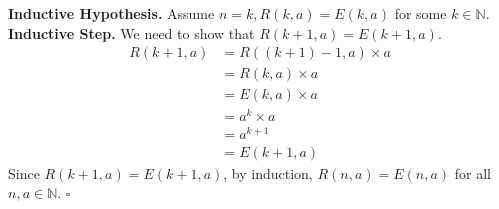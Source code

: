 \documentclass[11pt]{article}
\begin{document}
\textbf{Inductive Hypothesis. } Assume $n=k, R(k, a) = E(k, a)$ for some $k \in \mathbb{N}$. \\
\textbf{Inductive Step. } We need to show that $R(k+1, a) = E(k+1, a)$. 
\begin{align*}
    R(k+1, a) &= R((k+1)-1, a) \times a \\
    &= R(k, a) \times a \\
    &= E(k, a) \times a \\
    &= a^k \times a \\
    &= a^{k+1} \\
    &= E(k+1, a)
\end{align*}
Since $R(k+1, a) = E(k+1, a)$, by induction, $R(n, a) = E(n, a)$ for all $n, a \in \mathbb{N}$. \hfill $\square$
\end{document}
